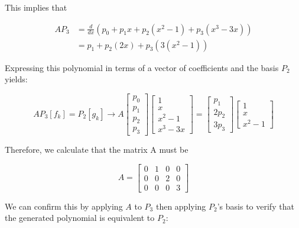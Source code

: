 \documentclass{article}
\begin{document}
		This implies that 
		
		\begin{center}
			\begin{align*}
				AP_{3}&=\frac{d}{dx}(p_{0}+p_{1}x+p_{2}(x^{2}-1)+p_{3}(x^{3}-3x)) \\
				&=p_{1}+p_{2}(2x)+p_{3}(3(x^{2}-1))
			\end{align*}
		\end{center}
		
		Expressing this polynomial in terms of a vector of coefficients and the basis $P_{2}$ yields:
		
		\begin{center}
			\begin{equation}
			AP_{3}[f_{k}] = P_{2}[g_{k}]\rightarrow A
			\begin{bmatrix} p_{0}\\p_{1}\\p_{2}\\p_{3}\end{bmatrix}
			\begin{bmatrix} 1 \\ x \\ x^{2}-1 \\ x^{3}-3x \end{bmatrix}=
			\begin{bmatrix} p_{1}\\2p_{2}\\3p_{3}\end{bmatrix}
			\begin{bmatrix} 1 \\ x \\ x^{2}-1\end{bmatrix}
			\end{equation}
		\end{center}
		
		Therefore, we calculate that the matrix A must be 
		
		\begin{center}
			\begin{equation}
				A= \begin{bmatrix}0&1&0&0\\0&0&2&0\\0&0&0&3\end{bmatrix}
			\end{equation}
		\end{center}
		
		We can confirm this by applying $A$ to $P_{3}$ then applying $P_{2}$'s basis to verify that the generated polynomial is equivalent to $P_{2}$:
		
\end{document}
